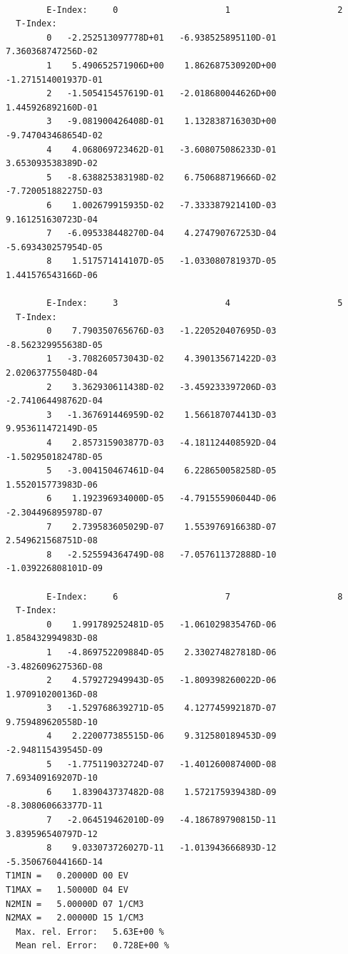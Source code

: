 \documentclass[12pt,dvipdfmx]{article}
\begin{document}
\begin{small}\begin{verbatim}

        E-Index:     0                     1                     2
  T-Index:
        0   -2.252513097778D+01   -6.938525895110D-01    7.360368747256D-02
        1    5.490652571906D+00    1.862687530920D+00   -1.271514001937D-01
        2   -1.505415457619D-01   -2.018680044626D+00    1.445926892160D-01
        3   -9.081900426408D-01    1.132838716303D+00   -9.747043468654D-02
        4    4.068069723462D-01   -3.608075086233D-01    3.653093538389D-02
        5   -8.638825383198D-02    6.750688719666D-02   -7.720051882275D-03
        6    1.002679915935D-02   -7.333387921410D-03    9.161251630723D-04
        7   -6.095338448270D-04    4.274790767253D-04   -5.693430257954D-05
        8    1.517571414107D-05   -1.033080781937D-05    1.441576543166D-06

        E-Index:     3                     4                     5
  T-Index:
        0    7.790350765676D-03   -1.220520407695D-03   -8.562329955638D-05
        1   -3.708260573043D-02    4.390135671422D-03    2.020637755048D-04
        2    3.362930611438D-02   -3.459233397206D-03   -2.741064498762D-04
        3   -1.367691446959D-02    1.566187074413D-03    9.953611472149D-05
        4    2.857315903877D-03   -4.181124408592D-04   -1.502950182478D-05
        5   -3.004150467461D-04    6.228650058258D-05    1.552015773983D-06
        6    1.192396934000D-05   -4.791555906044D-06   -2.304496895978D-07
        7    2.739583605029D-07    1.553976916638D-07    2.549621568751D-08
        8   -2.525594364749D-08   -7.057611372888D-10   -1.039226808101D-09

        E-Index:     6                     7                     8
  T-Index:
        0    1.991789252481D-05   -1.061029835476D-06    1.858432994983D-08
        1   -4.869752209884D-05    2.330274827818D-06   -3.482609627536D-08
        2    4.579272949943D-05   -1.809398260022D-06    1.970910200136D-08
        3   -1.529768639271D-05    4.127745992187D-07    9.759489620558D-10
        4    2.220077385515D-06    9.312580189453D-09   -2.948115439545D-09
        5   -1.775119032724D-07   -1.401260087400D-08    7.693409169207D-10
        6    1.839043737482D-08    1.572175939438D-09   -8.308060663377D-11
        7   -2.064519462010D-09   -4.186789790815D-11    3.839596540797D-12
        8    9.033073726027D-11   -1.013943666893D-12   -5.350676044166D-14
T1MIN =   0.20000D 00 EV
T1MAX =   1.50000D 04 EV
N2MIN =   5.00000D 07 1/CM3
N2MAX =   2.00000D 15 1/CM3
  Max. rel. Error:   5.63E+00 %
  Mean rel. Error:   0.728E+00 %
\end{verbatim}\end{small}
\end{document}
